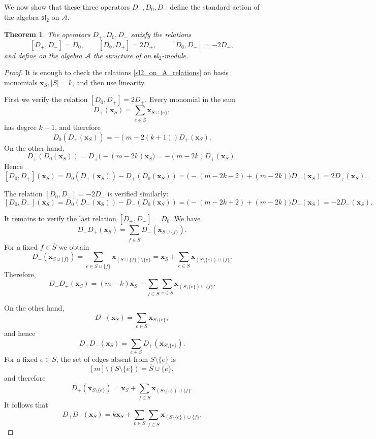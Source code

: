 \documentclass[10pt,a4paper]{amsart}
\newtheorem{theorem}{Theorem}[section]
\begin{document}
We now show that these three operators $D_+,D_0,D_-$ define the standard
action of the algebra $\mathfrak{sl}_2$ on $\mathcal A$.
\begin{theorem}
The operators $D_+,D_0,D_-$ satisfy the relations
\begin{equation}\label{sl2_on_A_relations}
[D_+,D_-]=D_0,\qquad
[D_0,D_+]=2D_+,\qquad
[D_0,D_-]=-2D_-,
\end{equation}
and define on the algebra $\mathcal A$ the structure of an
$\mathfrak{sl}_2$-module.
\end{theorem}

\begin{proof}
It is enough to check the relations \eqref{sl2_on_A_relations} on basis
monomials $\boldsymbol{x}_S, |S|=k$, and then use linearity.

\smallskip

First we verify the relation
$
[D_0,D_+]=2D_+.
$
Every monomial in the sum
$$
D_+(\boldsymbol{x}_S)=\sum_{e\in\overline S}\boldsymbol{x}_{S\cup\{e\}},
$$
has degree $k+1$, and therefore
$$
D_0(D_+(\boldsymbol{x}_S))=-(m-2(k+1))D_+(\boldsymbol{x}_S).
$$
On the other hand,
$$
D_+(D_0(\boldsymbol{x}_S))=D_+\bigl(-(m-2k)\boldsymbol{x}_S\bigr)=-(m-2k)D_+(\boldsymbol{x}_S).
$$
Hence
$$
[D_0,D_+](\boldsymbol{x}_S)
=
D_0(D_+(\boldsymbol{x}_S))-D_+(D_0(\boldsymbol{x}_S))
=
\bigl(-(m-2k-2)+(m-2k)\bigr)D_+(\boldsymbol{x}_S)
=
2D_+(\boldsymbol{x}_S).
$$

The relation $[D_0,D_-]=-2D_-$ is verified similarly:
$$
[D_0,D_-](\boldsymbol{x}_S)
=
D_0(D_-(\boldsymbol{x}_S))-D_-(D_0(\boldsymbol{x}_S))
=
\bigl(-(m-2k+2)+(m-2k)\bigr)D_-(\boldsymbol{x}_S)
=
-2D_-(\boldsymbol{x}_S).
$$

It remains to verify the last relation
$
[D_+,D_-]=D_0.
$
We have
$$
D_-D_+(\boldsymbol{x}_S)
=
\sum_{f\in\overline S}D_-(\boldsymbol{x}_{S\cup\{f\}}).
$$
For a fixed $f\in\overline S$ we obtain
$$
D_-(\boldsymbol{x}_{S\cup\{f\}})
=
\sum_{e\in S\cup\{f\}}\boldsymbol{x}_{(S\cup\{f\})\setminus\{e\}}
=
\boldsymbol{x}_S+\sum_{e\in S}\boldsymbol{x}_{(S\setminus\{e\})\cup\{f\}}.
$$
Therefore,
$$
D_-D_+(\boldsymbol{x}_S)
=
(m-k)\boldsymbol{x}_S+\sum_{f\in\overline S}\sum_{e\in S}\boldsymbol{x}_{(S\setminus\{e\})\cup\{f\}}.
$$

On the other hand,
$$
D_-(\boldsymbol{x}_S)=\sum_{e\in S}\boldsymbol{x}_{S\setminus\{e\}},
$$
and hence
$$
D_+D_-(\boldsymbol{x}_S)
=
\sum_{e\in S}D_+(\boldsymbol{x}_{S\setminus\{e\}}).
$$
For a fixed $e\in S$, the set of edges absent from $S\setminus\{e\}$ is
$$
[m]\setminus (S\setminus\{e\})=\overline S\cup\{e\},
$$
and therefore
\begin{equation}\label{r2}
D_+(\boldsymbol{x}_{S\setminus\{e\}})
=
\boldsymbol{x}_S+\sum_{f\in\overline S}\boldsymbol{x}_{(S\setminus\{e\})\cup\{f\}}.
\end{equation}
It follows that
$$
D_+D_-(\boldsymbol{x}_S)
=
k\boldsymbol{x}_S+\sum_{e\in S}\sum_{f\in\overline S}\boldsymbol{x}_{(S\setminus\{e\})\cup\{f\}}.
$$


\end{proof}
\end{document}
